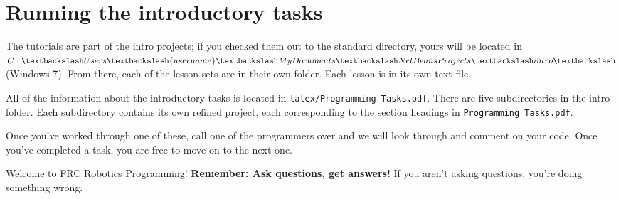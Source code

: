 \documentclass[a4paper]{article}
\begin{document}
\section{Running the introductory tasks}

The tutorials are part of the intro projects; if you checked them out to the standard directory, yours will be located in $C:\textbackslash Users\textbackslash\{username\}\textbackslash My Documents\textbackslash NetBeansProjects\textbackslash intro\textbackslash$ (Windows 7). From there, each of the lesson sets are in their own folder. Each lesson is in its own text file.

All of the information about the introductory tasks is located in \lstinline{latex/Programming Tasks.pdf}. There are five subdirectories in the intro folder. Each subdirectory contains its own refined project, each corresponding to the section headings in \lstinline{Programming Tasks.pdf}. 

Once you've worked through one of these, call one of the programmers over and we will look through and comment on your code. Once you've completed a task, you are free to move on to the next one. 

Welcome to FRC Robotics Programming! \textbf{Remember: Ask questions, get answers!} If you aren't asking questions, you're doing something wrong.
\end{document}
